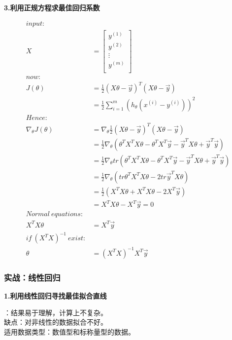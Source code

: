 \noindent\textbf{3.利用正规方程求最佳回归系数}\par
\begin{equation}\nonumber
\begin{split}
input:&\\
X& = \left[\begin{array}{c}
    y^{(1)}\\
    y^{(2)}\\
    \vdots\\
    y^{(m)}\\
     \end{array}\right]\\
now:&\\
J(\theta)&=\frac{1}{2}(X\theta-\vec{y})^T (X\theta-\vec{y})\\
         &=\frac{1}{2}\sum_{i=1}^{m}(h_\theta(x^{(i)}-y^{(i)}))^2\\
Hence:&\\
\nabla_\theta J(\theta)&=\nabla_\theta\frac{1}{2}(X\theta-\vec{y})^T(X\theta-\vec{y})\\
                       &=\frac{1}{2}\nabla_\theta(\theta^TX^TX\theta-\theta^TX^T\vec{y}-\vec{y}^TX\theta+\vec{y}^T\vec{y})\\
                       &=\frac{1}{2}\nabla_\theta tr(\theta^TX^TX\theta-\theta^TX^T\vec{y}-\vec{y}^TX\theta+\vec{y}^T\vec{y})\\
                       &=\frac{1}{2}\nabla_\theta(tr\theta^TX^TX\theta-2tr\vec{y}^TX\theta)\\
                       &=\frac{1}{2}(X^TX\theta+X^TX\theta-2X^T\vec{y})\\
                       &=X^TX\theta-X^T\vec{y}=0\\
Normal~equations:&\\
X^TX\theta &=X^T\vec{y}\\
if~(X^TX)^{-1}~exist:&\\
\theta&=(X^TX)^{-1}X^T\vec{y}
\end{split}
\end{equation}

\subsubsection{实战：线性回归}
\noindent\textbf{1.利用线性回归寻找最佳拟合直线}\par
{}：结果易于理解，计算上不复杂。\\
缺点：对非线性的数据拟合不好。\\
适用数据类型：数值型和标称量型的数据。

